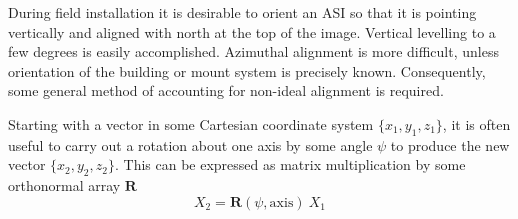 \documentclass[11pt,twoside]{article}   %
\begin{document}
During field installation it is desirable to orient an ASI so that
it is pointing vertically and aligned with north at the top of the
image. Vertical levelling to a few degrees is easily accomplished.
Azimuthal alignment is more difficult, unless orientation of the
building or mount system is precisely known. Consequently, some
general method of accounting for non-ideal alignment is required.

Starting with a vector in some Cartesian coordinate system
$\{x_1,y_1,z_1\}$, it is often useful to carry out a rotation
about one axis by some angle $\psi$ to produce the new vector
$\{x_2,y_2,z_2\}$. This can be expressed as matrix multiplication
by some orthonormal array $\mathbf{R}$
%
 \begin{equation}
  X_2 = \mathbf{R}(\psi,\mathrm{axis}) \: X_1
 \end{equation}
\end{document}
